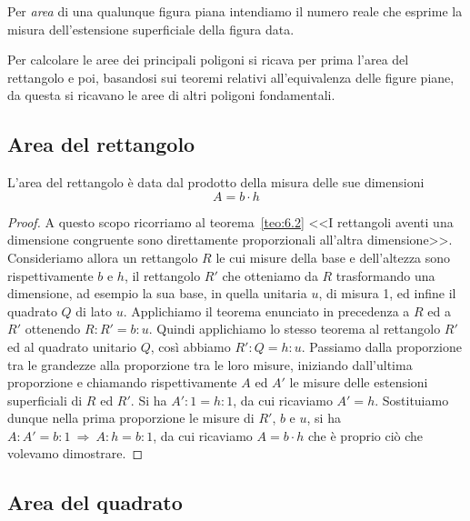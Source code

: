 Per \emph{area} di una qualunque figura piana intendiamo il numero 
reale che esprime la misura dell'estensione superficiale della figura 
data.

Per calcolare le aree dei principali poligoni si ricava per prima 
l'area del rettangolo e poi, basandosi sui teoremi relativi 
all'equivalenza delle figure piane, da questa si ricavano le aree di 
altri poligoni fondamentali.

\subsection{Area del rettangolo}

\begin{teorema}
L'area del rettangolo è data dal prodotto della misura delle sue 
dimensioni
\[\boxed{A=b\cdot h}\]
\end{teorema}

\begin{figure*}[!htb]
	\centering
\end{figure*}

\begin{proof}
A questo scopo ricorriamo al teorema~\ref{teo:6.2} <<I rettangoli 
aventi una dimensione congruente sono direttamente proporzionali 
all'altra dimensione>>. Consideriamo allora un rettangolo \(R\) le cui 
misure della base e dell'altezza sono rispettivamente \(b\) e \(h\), il 
rettangolo \(R'\) che otteniamo da \(R\) trasformando una dimensione, ad 
esempio la sua base, in quella unitaria \(u\), di misura 1, ed infine 
il quadrato \(Q\) di lato \(u\).
Applichiamo il teorema enunciato in precedenza a \(R\) ed a \(R'\) 
ottenendo \(R : R' = b : u\).
Quindi applichiamo lo stesso teorema al rettangolo \(R'\) ed al 
quadrato unitario \(Q\), così abbiamo \(R' : Q = h : u\).
Passiamo dalla proporzione tra le grandezze alla proporzione tra le 
loro misure, iniziando dall'ultima proporzione e chiamando 
rispettivamente \(A\) ed \(A'\) le misure delle estensioni superficiali 
di \(R\) ed \(R'\). Si ha \(A' : 1 = h : 1\), da cui ricaviamo \(A' = h\).
Sostituiamo dunque nella prima proporzione le misure di \(R'\), \(b\) e 
\(u\), si ha \(A : A' = b : 1 \:\Rightarrow\: A : h = b : 1\), da cui 
ricaviamo \(A=b\cdot h\)
che è proprio ciò che volevamo dimostrare.
\end{proof}

\subsection{Area del quadrato}

